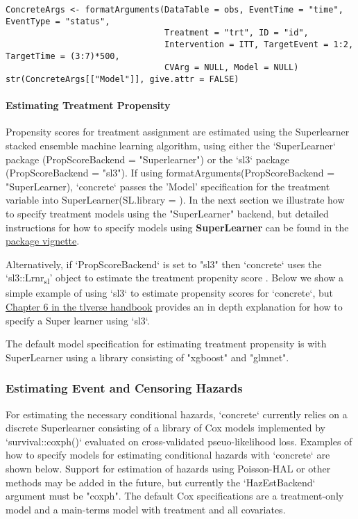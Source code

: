 \documentclass{report}
\newcommand{\1}{\ensuremath{\mathbf{1}}}
\begin{document}
\begin{lstlisting}
ConcreteArgs <- formatArguments(DataTable = obs, EventTime = "time", EventType = "status", 
                                Treatment = "trt", ID = "id", 
                                Intervention = ITT, TargetEvent = 1:2, TargetTime = (3:7)*500, 
                                CVArg = NULL, Model = NULL)
str(ConcreteArgs[["Model"]], give.attr = FALSE)
\end{lstlisting}

\paragraph{Estimating Treatment Propensity}
Propensity scores for treatment assignment are estimated using the Superlearner stacked ensemble machine learning algorithm, using either the `SuperLearner` package (PropScoreBackend = "Superlearner") or the `sl3` package (PropScoreBackend = "sl3").  If using formatArguments(PropScoreBackend = "SuperLearner), `concrete`  passes the 'Model' specification for the treatment variable into SuperLearner(SL.library = ). In the next section we illustrate how to specify treatment models using the "SuperLearner" backend, but detailed instructions for how to specify models using \textbf{SuperLearner} can be found in the \href{https://cran.r-project.org/web/packages/SuperLearner/vignettes/Guide-to-SuperLearner.html}{package vignette}.

Alternatively, if `PropScoreBackend` is set to "sl3" then `concrete` uses the `sl3::Lrnr\textsubscript{sl}' object to estimate the treatment propenity score . Below we show a simple example of using `sl3` to estimate propensity scores for `concrete`, but  \href{https://tlverse.org/tlverse-handbook/sl3.html}{Chapter 6 in the tlverse handbook} provides an in depth explanation for how to specify a Super learner using `sl3`.

The default model specification for estimating treatment propensity is with SuperLearner using a library consisting of "xgboost" and "glmnet".

\subsubsection{Estimating Event and Censoring Hazards}

For estimating the necessary conditional hazards, `concrete` currently relies on a discrete Superlearner consisting of a library of Cox models implemented by `survival::coxph()` evaluated on cross-validated pseuo-likelihood loss. Examples of how to specify models for estimating conditional hazards with `concrete` are shown below. Support for estimation of hazards using Poisson-HAL or other methods may be added in the future, but currently the `HazEstBackend` argument must be "coxph". The default Cox specifications are a treatment-only model and a main-terms model with treatment and all covariates.  
\end{document}
